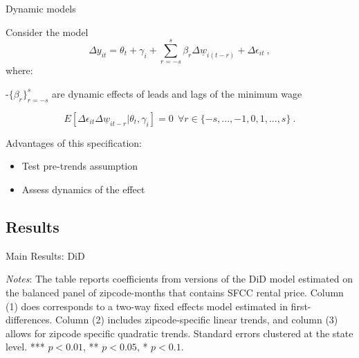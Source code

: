 \documentclass[ignorenonframetext,aspectratio=169]{beamer}
\providecommand{\tightlist}{%
  \setlength{\itemsep}{0pt}\setlength{\parskip}{0pt}}
\begin{document}
\begin{frame}{Dynamic models}
\protect\hypertarget{dynamic-models}{}

Consider the model \begin{equation}\label{eq:leads_lags}
    \Delta y_{it} = \theta_t + \gamma_i + \sum_{r=-s}^{s}\beta_r \Delta \underline{w}_{i(t-r)} 
                    + \Delta \epsilon_{it} \ ,
\end{equation} where:

-\(\{\beta_r\}_{r=-s}^{s}\) are dynamic effects of leads and lags of the
minimum wage

\[E \left[ \Delta \epsilon_{it} \Delta \underline{w}_{it-r} \big| \theta_{t}, \gamma_{i} \right] = 0
    \ \ \forall r\in\{-s, ..., -1, 0, 1, ..., s\} \ . \]

Advantages of this specification:

\begin{itemize}
\tightlist
\item
  Test pre-trends assumption
\item
  Assess dynamics of the effect
\end{itemize}

\end{frame}

\hypertarget{results}{%
\subsection{Results}\label{results}}

\begin{frame}{Main Results: DiD}
\protect\hypertarget{main-results-did}{}

\begin{table}[h!]
    \centering
    \resizebox{0.8\textwidth}{!}{
        }
    \begin{minipage}{0.9\textwidth} \footnotesize
        \vspace{3mm} 
        \textit{Notes}: The table reports coefficients from versions of the DiD model estimated 
        on the balanced panel of zipcode-months that contains SFCC rental price. Column (1) does 
        corresponds to a two-way fixed effects model estimated in first-differences. Column (2) 
        includes zipcode-specific linear trends, and column (3) allows for zipcode specific quadratic 
        trends. Standard errors clustered at the state level. 
        *** $p < 0.01$, ** $p < 0.05$, * $p < 0.1$.
    \end{minipage}
\end{table}

\end{frame}
\end{document}
